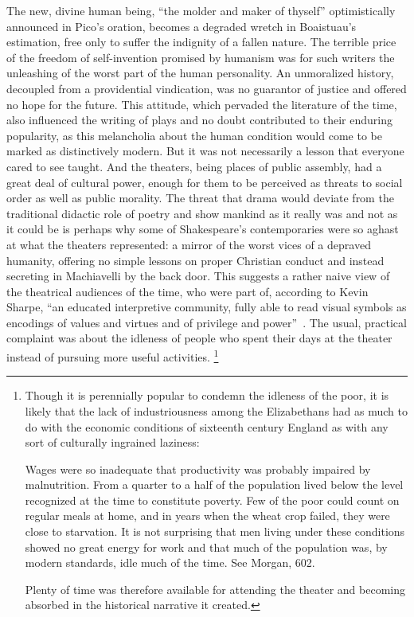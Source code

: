 The new, divine human being, ``the molder and maker of thyself'' optimistically announced in Pico's oration, becomes a degraded wretch in Boaistuau's estimation, free only to suffer the indignity of a fallen nature. The terrible price of the freedom of self-invention promised by humanism was for such writers the unleashing of the worst part of the human personality. An unmoralized history, decoupled from a providential vindication, was no guarantor of justice and offered no hope for the future. This attitude, which pervaded the literature of the time, also influenced the writing of plays and no doubt contributed to their enduring popularity, as this melancholia about the human condition would come to be marked as distinctively modern. But it was not necessarily a lesson that everyone cared to see taught. And the theaters, being places of public assembly, had a great deal of cultural power, enough for them to be perceived as threats to social order as well as public morality. The threat that drama would deviate from the traditional didactic role of poetry and show mankind as it really was and not as it could be is perhaps why some of Shakespeare's contemporaries were so aghast at what the theaters represented: a mirror of the worst vices of a depraved humanity, offering no simple lessons on proper Christian conduct and instead secreting in Machiavelli by the back door. This suggests a rather naive view of the theatrical audiences of the time, who were part of, according to Kevin Sharpe, ``an educated interpretive community, fully able to read visual symbols as encodings of values and virtues and of privilege and power''~\cite[359]{sharpe_selling_2009}. The usual, practical complaint was about the idleness of people who spent their days at the theater instead of pursuing more useful activities.
\footnote{Though it is perennially popular to condemn the idleness of the poor, it is likely that the lack of industriousness among the Elizabethans had as much to do with the economic conditions of sixteenth century England as with any sort of culturally ingrained laziness:
\begin{bq}
Wages were so inadequate that productivity was probably impaired by malnutrition. From a quarter to a half of the population lived below the level recognized at the time to constitute poverty. Few of the poor could count on regular meals at home, and in years when the wheat crop failed, they were close to starvation. It is not surprising that men living under these conditions showed no great energy for work and that much of the population was, by modern standards, idle much of the time. See Morgan, 602.\nocite{morgan_labor_1971}
\end{bq}
Plenty of time was therefore available for attending the theater and becoming absorbed in the historical narrative it created.}
